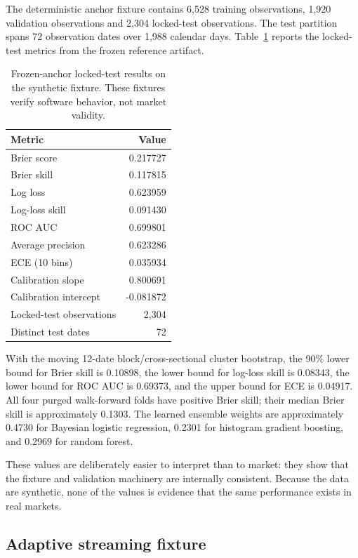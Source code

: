 \documentclass[11pt]{article}
\begin{document}
The deterministic anchor fixture contains 6,528 training observations, 1,920 validation observations and 2,304 locked-test observations. The test partition spans 72 observation dates over 1,988 calendar days. Table~\ref{tab:anchorresults} reports the locked-test metrics from the frozen reference artifact.

\begin{table}[tbp]
\centering
\small
\caption{Frozen-anchor locked-test results on the synthetic fixture. These fixtures verify software behavior, not market validity.}
\label{tab:anchorresults}
\begin{tabular}{@{}lr@{}}
\toprule
Metric & Value \\
\midrule
Brier score & 0.217727 \\
Brier skill & 0.117815 \\
Log loss & 0.623959 \\
Log-loss skill & 0.091430 \\
ROC AUC & 0.699801 \\
Average precision & 0.623286 \\
ECE (10 bins) & 0.035934 \\
Calibration slope & 0.800691 \\
Calibration intercept & -0.081872 \\
Locked-test observations & 2,304 \\
Distinct test dates & 72 \\
\bottomrule
\end{tabular}
\end{table}

With the moving 12-date block/cross-sectional cluster bootstrap, the 90\% lower bound for Brier skill is 0.10898, the lower bound for log-loss skill is 0.08343, the lower bound for ROC AUC is 0.69373, and the upper bound for ECE is 0.04917. All four purged walk-forward folds have positive Brier skill; their median Brier skill is approximately 0.1303. The learned ensemble weights are approximately 0.4730 for Bayesian logistic regression, 0.2301 for histogram gradient boosting, and 0.2969 for random forest.

These values are deliberately easier to interpret than to market: they show that the fixture and validation machinery are internally consistent. Because the data are synthetic, none of the values is evidence that the same performance exists in real markets.

\subsection{Adaptive streaming fixture}
\end{document}
